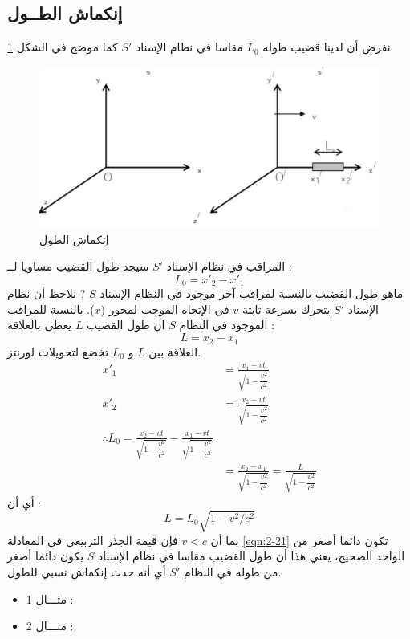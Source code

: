 \subsection{إنكماش الطــول}
نفرض أن لدينا قضيب طوله $L_{0}$ مقاسا في نظام الإسناد $S'$ كما موضح في الشكل \ref{fig:-2_4}
\begin{figure}[h!]
	\centering
	\includegraphics[width=0.6\linewidth, height=0.2\textheight]{"Fig/Fig_II/الشكل 2_4"}
	\caption{إنكماش الطول}
	\label{fig:-2_4}
\end{figure}
المراقب في نظام الإسناد 
$S'$ 
سيجد طول القضيب مساويا لــ :
\begin{equation}
	L_{0} = x'_{2} -x'_{1}
\end{equation}
ماهو طول القضيب بالنسبة لمراقب آخر موجود في النظام الإسناد $S$ ?
نلاحظ أن نظام الإسناد $S'$ يتحرك بسرعة ثابتة $v$ في الإتجاه الموجب لمحور ($x$). بالنسبة للمراقب الموجود في النظام $S$ ان طول القضيب $L$ يعطى بالعلاقة : 
\begin{equation}
	L=x_{2} - x_{1}
\end{equation}
العلاقة بين $L$ و $L_{0}$ تخضع لتحويلات لورنتز.
\begin{equation}
	\begin{aligned}
		x'_{1} & =  \frac{x_{1}-vt}{\sqrt{1-\dfrac{v^{2}}{c^{2}}}} \\
		x'_{2} & =  \frac{x_{2}-vt}{\sqrt{1-\dfrac{v^{2}}{c^{2}}}} \\
		\therefore L_{0}= \frac{x_{2}-vt}{\sqrt{1-\dfrac{v^{2}}{c^{2}}}}- \frac{x_{1}-vt}{\sqrt{1-\dfrac{v^{2}}{c^{2}}}} \\
		& = \frac{x_{2}-x_{1}}{\sqrt{1-\dfrac{v^{2}}{c^{2}}}} = \frac{L}{\sqrt{1-\dfrac{v^{2}}{c^{2}}}}
		\end{aligned}
\end{equation}
أي أن : 
\begin{equation}
	\label{eqn:2-21}
	L=L_{0}\sqrt{1-v^{2}/c^{2}}
\end{equation}
بما أن $v<c$ فإن قيمة الجذر التربيعي في المعادلة
\eqref{eqn:2-21} 
تكون دائما أصغر من الواحد الصحيح، يعني هذا أن طول القضيب مقاسا في نظام الإسناد $S$ يكون دائما أصغر من طوله في النظام $S'$ أي أنه حدث إنكماش نسبي للطول.
\begin{itemize}
	\item مثـــال 1 :
	\item مثـــال 2 :
\end{itemize}
